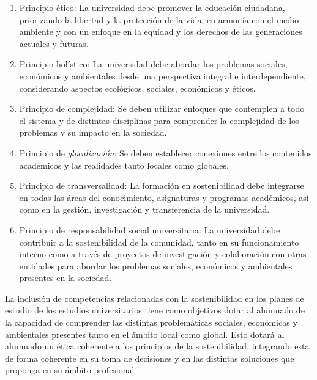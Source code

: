 \begin{enumerate}
	\item Principio ético: La universidad debe promover la educación ciudadana, priorizando la libertad y la protección de la vida, en armonía con el medio ambiente y con un enfoque en la equidad y los derechos de las generaciones actuales y futuras.
	\item Principio holístico: La universidad debe abordar los problemas sociales, económicos y ambientales desde una perspectiva integral e interdependiente, considerando aspectos ecológicos, sociales, económicos y éticos.
	\item Principio de complejidad: Se deben utilizar enfoques que contemplen a todo el sistema y de distintas disciplinas para comprender la complejidad de los problemas y su impacto en la sociedad.
	\item Principio de \textit{glocalización}: Se deben establecer conexiones entre los contenidos académicos y las realidades tanto locales como globales.
	\item Principio de transversalidad: La formación en sostenibilidad debe integrarse en todas las áreas del conocimiento, asignaturas y programas académicos, así como en la gestión, investigación y transferencia de la universidad.
	\item Principio de responsabilidad social universitaria: La universidad debe contribuir a la sostenibilidad de la comunidad, tanto en su funcionamiento interno como a través de proyectos de investigación y colaboración con otras entidades para abordar los problemas sociales, económicos y ambientales presentes en la sociedad.
\end{enumerate}

La inclusión de competencias relacionadas con la sostenibilidad en los planes de estudio de los estudios universitarios tiene como objetivos dotar al alumnado de 
la capacidad de comprender las distintas problemáticas sociales, económicas y ambientales presentes tanto en el ámbito local como global. Esto dotará al alumnado un ética coherente a los principios de la sostenibilidad, integrando esta de forma coherente en su toma de decisiones y en las distintas soluciones que proponga en su ámbito profesional~\cite{direcsost}.

